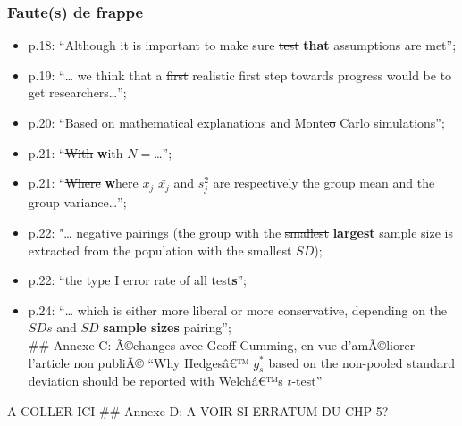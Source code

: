 \begin{appendix}
\hypertarget{fautes-de-frappe-1}{%
\subsubsection{Faute(s) de frappe}\label{fautes-de-frappe-1}}

\begin{itemize}
\tightlist
\item
  p.18: ``Although it is important to make sure \sout{test}
  \textbf{that} assumptions are met'';\\
\item
  p.19: ``\ldots{} we think that a \sout{first} realistic first step
  towards progress would be to get researchers\ldots{}'';\\
\item
  p.20: ``Based on mathematical explanations and Monte\sout{o} Carlo
  simulations'';\\
\item
  p.21: ``\sout{With} \textbf{w}ith \(N=\)\ldots{}'';\\
\item
  p.21: ``\sout{Where} \textbf{w}here \sout{\(x_j\)} \(\bar{x_j}\) and
  \(s^2_j\) are respectively the group mean and the group
  variance\ldots{}'';\\
\item
  p.22: "\ldots{} negative pairings (the group with the \sout{smallest}
  \textbf{largest} sample size is extracted from the population with the
  smallest \(SD\));\\
\item
  p.22: ``the type I error rate of all test\textbf{s}'';\\
\item
  p.24: ``\ldots{} which is either more liberal or more conservative,
  depending on the \(SDs\) and \sout{\(SD\)} \textbf{sample sizes}
  pairing'';\\
  \newpage \#\# Annexe C: Ã©changes avec Geoff Cumming, en vue
  d'amÃ©liorer l'article non publiÃ© ``Why Hedgesâ€™ \(g^*_s\) based on
  the non-pooled standard deviation should be reported with Welchâ€™s
  \(t\)-test''
\end{itemize}

A COLLER ICI \newpage \#\# Annexe D: A VOIR SI ERRATUM DU CHP 5?
\end{appendix}
